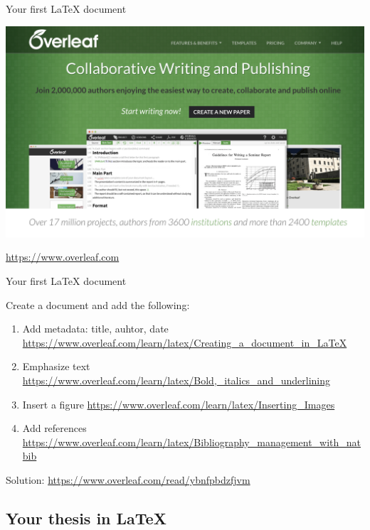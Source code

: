 \documentclass[inputenc]{beamer}
\begin{document}
\begin{frame}{Your first \LaTeX{} document}
    
    \includegraphics[width=\textwidth]{overleaf_website.png}
    
    \centering
    \url{https://www.overleaf.com}
    
\end{frame}

\begin{frame}{Your first \LaTeX{} document}
    
    Create a document and add the following:
    \begin{enumerate}
        \item Add metadata: title, auhtor, date \url{https://www.overleaf.com/learn/latex/Creating\_a\_document\_in\_LaTeX}
        \item Emphasize text \url{https://www.overleaf.com/learn/latex/Bold,\_italics\_and\_underlining}
        \item Insert a figure \url{https://www.overleaf.com/learn/latex/Inserting\_Images}
        \item Add references \url{https://www.overleaf.com/learn/latex/Bibliography\_management\_with\_natbib}
    \end{enumerate}
    
    \vspace{0.5cm}
    Solution: \url{https://www.overleaf.com/read/ybnfpbdzfjvm}
    
\end{frame}

\subsection{Your thesis in \LaTeX{}}
\end{document}

